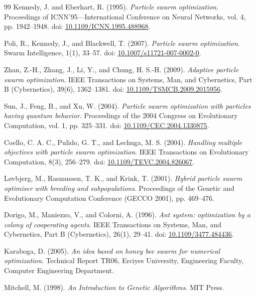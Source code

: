 \documentclass[12pt,a4paper]{article}
\begin{document}
\begin{thebibliography}{99}
Kennedy, J. and Eberhart, R. (1995). 
\textit{Particle swarm optimization}. 
Proceedings of ICNN'95---International Conference on Neural Networks, vol. 4, pp. 1942--1948.
doi: \href{https://doi.org/10.1109/ICNN.1995.488968}{10.1109/ICNN.1995.488968}.

Poli, R., Kennedy, J., and Blackwell, T. (2007).
\textit{Particle swarm optimization}.
Swarm Intelligence, 1(1), 33--57.
doi: \href{https://doi.org/10.1007/s11721-007-0002-0}{10.1007/s11721-007-0002-0}.

Zhan, Z.-H., Zhang, J., Li, Y., and Chung, H. S.-H. (2009).
\textit{Adaptive particle swarm optimization}.
IEEE Transactions on Systems, Man, and Cybernetics, Part B (Cybernetics), 39(6), 1362--1381.
doi: \href{https://doi.org/10.1109/TSMCB.2009.2015956}{10.1109/TSMCB.2009.2015956}.

Sun, J., Feng, B., and Xu, W. (2004).
\textit{Particle swarm optimization with particles having quantum behavior}.
Proceedings of the 2004 Congress on Evolutionary Computation, vol. 1, pp. 325--331.
doi: \href{https://doi.org/10.1109/CEC.2004.1330875}{10.1109/CEC.2004.1330875}.

Coello, C. A. C., Pulido, G. T., and Lechuga, M. S. (2004).
\textit{Handling multiple objectives with particle swarm optimization}.
IEEE Transactions on Evolutionary Computation, 8(3), 256--279.
doi: \href{https://doi.org/10.1109/TEVC.2004.826067}{10.1109/TEVC.2004.826067}.

L\o{}vbjerg, M., Rasmussen, T. K., and Krink, T. (2001).
\textit{Hybrid particle swarm optimiser with breeding and subpopulations}.
Proceedings of the Genetic and Evolutionary Computation Conference (GECCO 2001), pp. 469--476.

Dorigo, M., Maniezzo, V., and Colorni, A. (1996).
\textit{Ant system: optimization by a colony of cooperating agents}.
IEEE Transactions on Systems, Man, and Cybernetics, Part B (Cybernetics), 26(1), 29--41.
doi: \href{https://doi.org/10.1109/3477.484436}{10.1109/3477.484436}.

Karaboga, D. (2005).
\textit{An idea based on honey bee swarm for numerical optimization}.
Technical Report TR06, Erciyes University, Engineering Faculty, Computer Engineering Department.

Mitchell, M. (1998).
\textit{An Introduction to Genetic Algorithms}.
MIT Press.


\end{thebibliography}
\end{document}
